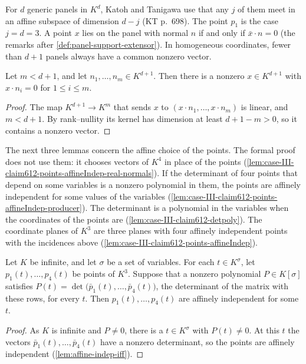 For $d$ generic panels in $K^d$, Katoh and Tanigawa use that any $j$
of them meet in an affine subspace of dimension $d - j$ (KT p.~698).
The point $p_1$ is the case $j = d = 3$. A point $x$ lies on the panel
with normal $n$ if and only if $\bar x \cdot n = 0$ (the remarks
after \cref{def:panel-support-extensor}). In homogeneous coordinates,
fewer than $d + 1$ panels always have a common nonzero vector.

\begin{lemma}
  \label{lem:case-III-claim612-panel-point-exists}
  \leanok
  Let $m < d + 1$, and let $n_1, \dots, n_m \in K^{d+1}$. Then there is
  a nonzero $x \in K^{d+1}$ with $x \cdot n_i = 0$ for
  $1 \le i \le m$.
\end{lemma}
\begin{proof}
  \leanok
  The map $K^{d+1} \to K^m$ that sends $x$ to
  $(x \cdot n_1, \dots, x \cdot n_m)$ is linear, and $m < d + 1$. By
  rank--nullity its kernel has dimension at least $d + 1 - m > 0$, so
  it contains a nonzero vector.
\end{proof}

The next three lemmas concern the affine choice of the points. The
formal proof does not use them: it chooses vectors of $K^4$ in place
of the points
(\cref{lem:case-III-claim612-points-affineIndep-real-normals}). If the
determinant of four points that depend on some variables is a nonzero
polynomial in them, the points are affinely independent for some
values of the variables
(\cref{lem:case-III-claim612-points-affineIndep-producer}). The
determinant is a polynomial in the variables when the coordinates of
the points are (\cref{lem:case-III-claim612-detpoly}). The coordinate planes of $K^3$
are three planes with four affinely independent points with the
incidences above (\cref{lem:case-III-claim612-points-affineIndep}).

\begin{lemma}
  \label{lem:case-III-claim612-points-affineIndep-producer}
  \leanok
  Let $K$ be infinite, and let $\sigma$ be a set of variables. For each
  $t \in K^\sigma$, let $p_1(t), \dots, p_4(t)$ be points of $K^3$.
  Suppose that a nonzero polynomial $P \in K[\sigma]$ satisfies
  $P(t) = \det\bigl(\bar p_1(t), \dots, \bar p_4(t)\bigr)$, the
  determinant of the matrix with these rows, for every $t$. Then
  $p_1(t), \dots, p_4(t)$ are affinely independent for some $t$.
\end{lemma}
\begin{proof}
  \leanok
  As $K$ is infinite and $P \neq 0$, there is a $t \in K^\sigma$ with
  $P(t) \neq 0$. At this $t$ the vectors
  $\bar p_1(t), \dots, \bar p_4(t)$ have a nonzero determinant, so the
  points are affinely independent (\cref{lem:affine-indep-iff}).
\end{proof}

